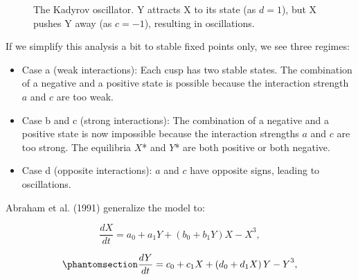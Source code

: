 \documentclass[
  a4paper,
  DIV=11,
  numbers=noendperiod,
  oneside]{scrreprt}
\begin{document}
\begin{figure}


\caption{\label{fig-ch4n-img17-old-65}The Kadyrov oscillator. Y attracts
X to its state (as \(d = 1\)), but X pushes Y away (as \(c = - 1\)),
resulting in oscillations.}

\end{figure}%

If we simplify this analysis a bit to stable fixed points only, we see
three regimes:

\begin{itemize}
\item
  Case a (weak interactions): Each cusp has two stable states. The
  combination of a negative and a positive state is possible because the
  interaction strength \(a\) and \(c\) are too weak.
\item
  Case b and c (strong interactions): The combination of a negative and
  a positive state is now impossible because the interaction strengths
  \(a\) and \(c\) are too strong. The equilibria \(X\)* and \(Y\)* are
  both positive or both negative.
\item
  Case d (opposite interactions): \(a\) and \(c\) have opposite signs,
  leading to oscillations.
\end{itemize}

Abraham et al. (1991) generalize the model to:

\[\frac{dX}{dt} = {a_{0} + a_{1}Y + (b_{0} + b_{1}Y)X - X}^{3},\]

\begin{equation}\phantomsection\label{eq-ch4n-19-old-39}{
\frac{dY}{dt} = {c_{0} + c_{1}X + \left( d_{0} + d_{1}X \right)Y - Y}^{3},
}\end{equation}
\end{document}
